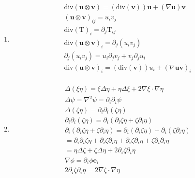 \begin{problem}
\begin{enumerate}
\begin{enumerate}
                \item \begin{align}
                    \text{div}(\mathbf{u}\otimes \mathbf{v})=(\text{div}(\mathbf{v}))\mathbf{u}+(\nabla \mathbf{u})\mathbf{v}  \\
                    (\mathbf{u}\otimes \mathbf{v})_{ij}=u_{i}v_{j} \\
                    \text{div}(\text{T})_{i}=\partial_{j}\text{T}_{ij} \\
                    \text{div}(\mathbf{u}\otimes \mathbf{v})_{i}=\partial_{j}(u_{i}v_{j}) \\
                    \partial_{j}(u_{i}v_{j})=u_{i}\partial_{j}v_{j}+v_{j}\partial_{j}u_{i} \\
                    \text{div}(\mathbf{u}\otimes \mathbf{v})_{i}=(\text{div}(\mathbf{v}))u_{i}+(\nabla \mathbf{u}\mathbf{v})_{i} \\
                    \end{align}
                \item \begin{align}
                    \Delta(\xi \eta)=\xi\Delta \eta+\eta\Delta \xi+2\nabla \xi \cdot \nabla \eta \\
                    \Delta \psi=\nabla^2\psi=\partial_{i}\partial_{i}\psi \\
                    \Delta(\zeta \eta)=\partial_{i}\partial_{i}(\zeta \eta) \\
                    \partial_{i}\partial_{i}(\zeta \eta)=\partial_{i}(\partial_{i}\zeta \eta+\zeta \partial_{i}\eta) \\
                    \partial_{i}(\partial_{i}\zeta \eta+\zeta \partial_{i}\eta)=\partial_{i}(\partial_{i}\zeta \eta)+\partial_{i}(\zeta \partial_{i}\eta) \\
                    =\partial_{i}\partial_{i}\zeta \eta+\partial_{i}\zeta \partial_{i}\eta+\partial_{i}\zeta \partial_{i}\eta+\zeta \partial_{i}\partial_{i}\eta \\
                    =\eta\Delta \zeta+\zeta\Delta \eta+2\partial_{i}\zeta \partial_{i}\eta \\
                    \nabla \phi=\partial_{i}\phi \mathbf{e}_{i} \\
                    2\partial_{i}\zeta \partial_{i}\eta=2\nabla \zeta \cdot \nabla \eta
                    \end{align}

\end{enumerate}
\end{enumerate}
\end{problem}

